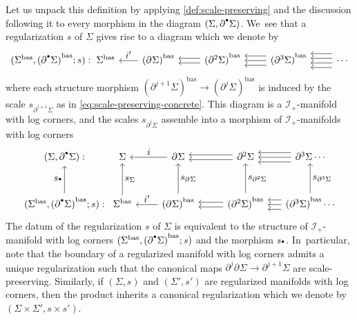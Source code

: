 \documentclass[JEP,XML,SOM,Unicode,NoFloatCountersInSection,published]{cedram}
\let\oldbullet\bullet
\renewcommand{\bullet}{{\raisebox{1pt}{$\scriptscriptstyle\oldbullet$}}}
\let\tst\textstyle
\theoremstyle{definition}
\theoremstyle{remark}
\newcommand{\Sig}{\Sigma}
\newcommand{\bas}[1]{{#1}^{\mathrm{bas}}}
\newcommand{\Sigbas}{\bas{\Sig}}
\newcommand{\bdSig}[1][]{\partial^{#1}\Sigma}
\newcommand{\ascat}{\mathscr{I}_+}
\begin{document}
Let us unpack this definition by applying \autoref{def:scale-preserving} and the discussion following it to every morphism in the diagram $(\Sig,\bdSig[\bullet])$. We~see that a regularization $s$ of $\Sig$ gives rise to a diagram which we denote by
\[
\begin{tikzcd}[column sep = .4cm, row sep = 1cm,baseline=-0.9cm]
(\Sigbas,\bas{(\bdSig[\bullet])};s): &[-.5cm] \Sigbas &[.3cm] \bas{(\bdSig)}\ar[l,"\tst i'"'] &[.4cm] \bas{(\bdSig[2])} \ar[l,shift left] \ar[l,shift right] &[.4cm] \bas{(\bdSig[3])} \ar[l,shift left = 2]\ar[l,shift left = 0]\ar[l,shift left = -2] &[.4cm] \cdots \ar[l,shift left = 3]\ar[l,shift left = 1]\ar[l,shift left = -1]\ar[l,shift left = -3]
\end{tikzcd}
\]
where each structure morphism $\bas{(\bdSig[j+1])}\to \bas{(\bdSig[j])}$ is induced by the scale $s_{\bdSig[j+1]}$ as in \eqref{eq:scale-preserving-concrete}. This diagram is a $\ascat$-manifold with log corners, and the scales $s_{\bdSig[j]}$ assemble into a morphism of $\ascat$-manifolds with log corners
\begin{equation}
\begin{tikzcd}[column sep = .5cm, row sep = 1cm]
(\Sig,\bdSig[\bullet]): &[-.5cm] \Sig &[.3cm] \bdSig \ar[l,"\tst i"'] &[.4cm] \bdSig[2] \ar[l,shift left] \ar[l,shift right] & \bdSig[3] \ar[l,shift left = 2]\ar[l,shift left = 0]\ar[l,shift left = -2] \cdots \\
(\Sigbas,\bas{(\bdSig[\bullet])};s): \ar[u,"\tst s_\bullet"]& \Sigbas \ar[u,"\tst s_\Sig"'] & \bas{(\bdSig)} \ar[l,"\tst i'"']\ar[u,"\tst s_{\bdSig}"'] & \bas{(\bdSig[2])}\ar[l,shift left] \ar[l,shift right]\ar[u,"\tst s_{\bdSig[2]}"'] & \bas{(\bdSig[3])} \ar[l,shift left = 2]\ar[l,shift left = 0]\ar[l,shift left = -2]\ar[u,"\tst s_{\bdSig[3]}"'] \cdots
\end{tikzcd}
\label{eq:regularization-diagram}
\end{equation}
The datum of the regularization $s$ of $\Sig$ is equivalent to the structure of $\ascat$-manifold with log corners $(\Sigbas,\bas{(\bdSig[\bullet])};s)$ and the morphism $s_\bullet$. In~particular, note that the boundary of a regularized manifold with log corners admits a unique regularization such that the canonical maps $\partial^j\bdSig \to \bdSig[j+1]$ are scale-preserving. Similarly, if $(\Sig,s)$ and $(\Sig',s')$ are regularized manifolds with log corners, then the product inherits a canonical regularization which we denote by $(\Sig\times\Sig',s\times s')$.
\end{document}
